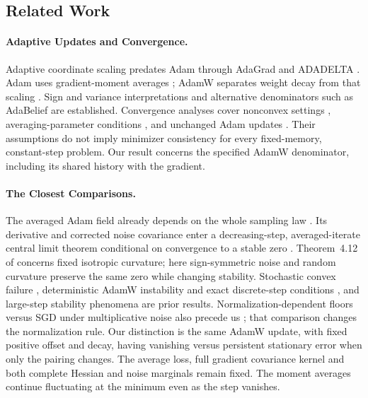 \subsection*{Related Work}
\paragraph{Adaptive Updates and Convergence.}
Adaptive coordinate scaling predates Adam through AdaGrad and ADADELTA
\cite{duchi2011adagrad,zeiler2012adadelta}. Adam uses gradient-moment
averages \cite{kingma2015adam}; AdamW separates weight decay from that
scaling \cite{loshchilov2019adamw}. Sign and variance interpretations
\cite{balles2018dissecting,bernstein2018signsgd} and alternative
denominators such as AdaBelief \cite{zhuang2020adabelief} are established.
Convergence analyses cover nonconvex settings
\cite{zaheer2018adaptive,chen2019adamtype}, averaging-parameter conditions
\cite{zou2019sufficient}, and unchanged Adam updates
\cite{defossez2022simple,zhang2022adam}. Their assumptions do not imply
minimizer consistency for every fixed-memory, constant-step problem.
Our result concerns the specified AdamW denominator, including its shared
history with the gradient.

\paragraph{The Closest Comparisons.}
The averaged Adam field already depends on the whole sampling law
\cite{dj2024}. Its derivative and corrected noise covariance enter a
decreasing-step, averaged-iterate central limit theorem conditional on
convergence to a stable zero \cite{dj2026}. Theorem~4.12 of
\cite{symmetry} concerns fixed isotropic curvature; here sign-symmetric
noise and random curvature preserve the same zero while changing stability.
Stochastic convex failure \cite{reddi}, deterministic AdamW instability
and exact discrete-step conditions
\cite[Proposition~4.3 and Appendix~A.6]{su}, and large-step stability
phenomena \cite{cohen_edge,adaptive_edge,eos} are prior results.
Normalization-dependent floors versus SGD under multiplicative noise also
precede us \cite{singh}; that comparison changes the normalization rule.
Our distinction is the same AdamW update, with fixed positive offset and
decay, having vanishing versus persistent stationary error when only the
pairing changes. The average loss, full gradient covariance kernel and both
complete Hessian and noise marginals remain fixed. The moment averages
continue fluctuating at the minimum even as the step vanishes.


